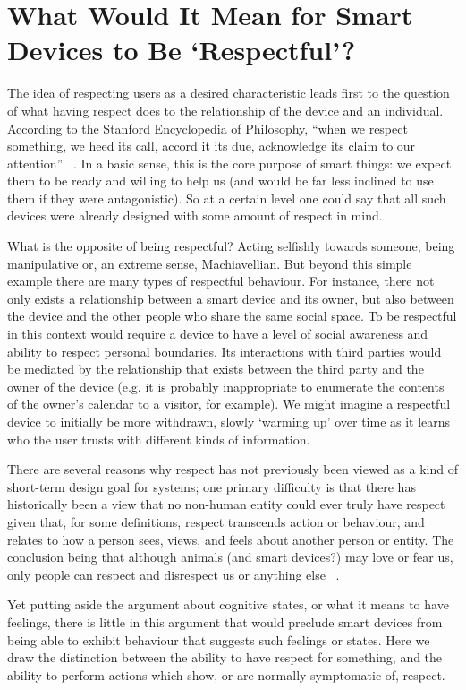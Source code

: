 \documentclass{IETpaper}
\begin{document}
\section{What Would It Mean for Smart Devices to Be `Respectful'?}

The idea of respecting users as a desired characteristic leads first to the question of what having respect does to the relationship of the device and an individual. According to the Stanford Encyclopedia of Philosophy, ``when we respect something, we heed its call, accord it its due, acknowledge its claim to our attention'' ~\cite{sep-respect}. In a basic sense, this is the core purpose of smart things: we expect them to be ready and willing to help us (and would be far less inclined to use them if they were antagonistic). So at a certain level one could say that all such devices were already designed with some amount of respect in mind.

What is the opposite of being respectful? Acting selfishly towards someone, being manipulative or, an extreme sense, Machiavellian. But beyond this simple example there are many types of respectful behaviour. For instance, there not only exists a relationship between a smart device and its owner, but also between the device and the other people who share the same social space. To be respectful in this context would require a device to have a level of social awareness and ability to respect personal boundaries. Its interactions with third parties would be mediated by the relationship that exists between the third party and the owner of the device (e.g. it is probably inappropriate to enumerate the contents of the owner's calendar to a visitor, for example). We might imagine a respectful device to initially be more withdrawn, slowly ‘warming up’ over time as it learns who the user trusts with different kinds of information.

There are several reasons why respect has not previously been viewed as a kind of short-term design goal for systems; one primary difficulty is that there has historically been a view that no non-human entity could ever truly have respect given that, for some definitions, respect transcends action or behaviour, and relates to how a person sees, views, and feels about another person or entity. The conclusion being that although animals (and smart devices?) may love or fear us, only people can respect and disrespect us or anything else ~\cite{sep-respect}.

Yet putting aside the argument about cognitive states, or what it means to have feelings, there is little in this argument that would preclude smart devices from being able to exhibit behaviour that suggests such feelings or states. Here we draw the distinction between the ability to have respect for something, and the ability to perform actions which show, or are normally symptomatic of, respect.
\end{document}
